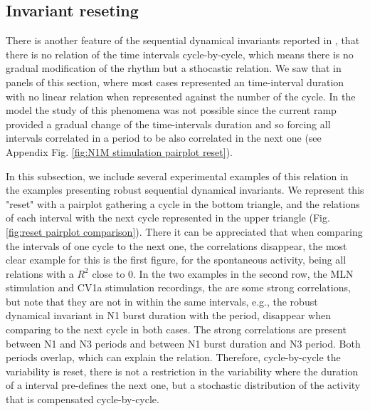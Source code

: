 \subsection{Invariant reseting}
There is another feature of the sequential dynamical invariants reported in \cite{elices_robust_2019}, that there is no relation of the time intervals cycle-by-cycle, which means there is no gradual modification of the rhythm but a sthocastic relation. We saw that in panels of this section, where most cases represented an time-interval duration with no linear relation when represented against the number of the cycle. In the model the study of this phenomena was not possible since the current ramp provided a gradual change of the time-intervals duration and so forcing all intervals correlated in a period to be also correlated in the next one (see Appendix Fig. \ref{fig:N1M stimulation pairplot reset}). 

In this subsection, we include several experimental examples of this relation in the examples presenting robust sequential dynamical invariants. We represent this "reset" with a pairplot gathering a cycle in the bottom triangle, and the relations of each interval with the next cycle represented in the upper triangle (Fig. \ref{fig:reset pairplot comparison}). There it can be appreciated that when comparing the intervals of one cycle to the next one, the correlations disappear, the most clear example for this is the first figure, for the spontaneous activity, being all relations with a $R^2$ close to 0. In the two examples in the second row, the MLN stimulation and CV1a stimulation recordings, the are some strong correlations, but note that they are not in within the same intervals, e.g., the robust dynamical invariant in N1 burst duration with the period, disappear when comparing to the next cycle in both cases. The strong correlations are present between N1 and N3 periods and between N1 burst duration and N3 period. Both periods overlap, which can explain the relation. Therefore, cycle-by-cycle the variability is reset, there is not a restriction in the variability where the duration of a interval pre-defines the next one, but a stochastic distribution of the activity that is compensated cycle-by-cycle. 


